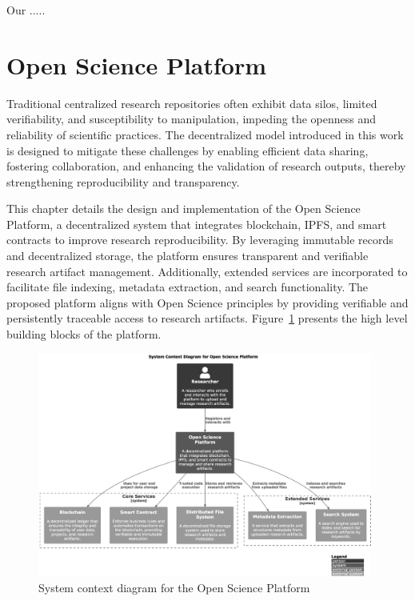 \documentclass[final]{rc-book-2.14}
\begin{document}
\drop Our .....

\newpage

\section{Open Science Platform}
\label{sec:proposed_model:osp}

Traditional centralized research repositories often exhibit data silos, limited verifiability, and susceptibility to manipulation, impeding the openness and reliability of scientific practices. The decentralized model introduced in this work is designed to mitigate these challenges by enabling efficient data sharing, fostering collaboration, and enhancing the validation of research outputs, thereby strengthening reproducibility and transparency.

This chapter details the design and implementation of the Open Science Platform, a decentralized system that integrates blockchain, IPFS, and smart contracts to improve research reproducibility. By leveraging immutable records and decentralized storage, the platform ensures transparent and verifiable research artifact management. Additionally, extended services are incorporated to facilitate file indexing, metadata extraction, and search functionality. The proposed platform aligns with Open Science principles by providing verifiable and persistently traceable access to research artifacts. Figure~\ref{fig:c4_context_diagram} presents the high level building blocks of the platform.


\begin{figure}[htbp]
    \centering
    \includegraphics[width=0.98\textwidth, keepaspectratio]{fig/c4_context_diagram.eps}
    \caption{System context diagram for the Open Science Platform}
    \label{fig:c4_context_diagram}
\end{figure}
\end{document}
